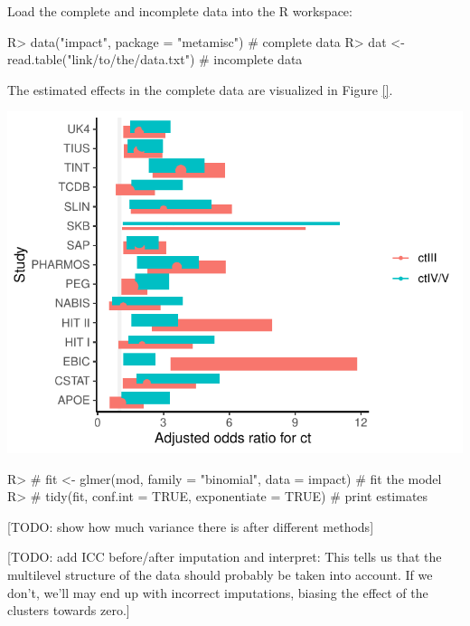 \documentclass[
]{jss}
\begin{document}
Load the complete and incomplete data into the R workspace:

\begin{CodeChunk}
\begin{CodeInput}
R> data("impact", package = "metamisc")      # complete data
R> dat <- read.table("link/to/the/data.txt") # incomplete data
\end{CodeInput}
\end{CodeChunk}

The estimated effects in the complete data are visualized in Figure
\ref{}.

\begin{CodeChunk}


\begin{center}\includegraphics{Imputation_of_Incomplete_Multilevel_Data_files/figure-latex/forest-1} \end{center}

\end{CodeChunk}

\begin{CodeChunk}
\begin{CodeInput}
R> # fit <- glmer(mod, family = "binomial", data = impact) # fit the model
R> # tidy(fit, conf.int = TRUE, exponentiate = TRUE)       # print estimates
\end{CodeInput}
\end{CodeChunk}

{[}TODO: show how much variance there is after different methods{]}

{[}TODO: add ICC before/after imputation and interpret: This tells us
that the multilevel structure of the data should probably be taken into
account. If we don't, we'll may end up with incorrect imputations,
biasing the effect of the clusters towards zero.{]}
\end{document}
